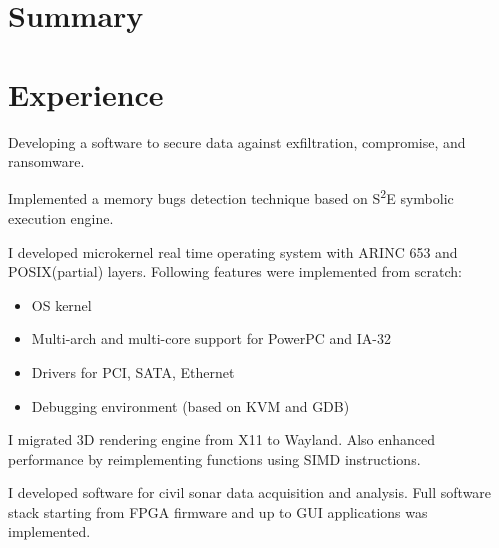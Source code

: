 \documentclass[11pt, a4paper]{moderncv}
\begin{document}
\makecvtitle



\section{Summary}





\section{Experience}

{
  Developing a software to secure data against exfiltration, compromise, and ransomware.
}

{
  Implemented a memory bugs detection technique based on S\textsuperscript{2}E symbolic execution engine.
}

{
  I developed microkernel real time operating system with ARINC 653 and POSIX(partial) layers.
  Following features were implemented from scratch:
    \begin{itemize}
    \item OS kernel
    \item Multi-arch and multi-core support for PowerPC and IA-32
    \item Drivers for PCI, SATA, Ethernet
    \item Debugging environment (based on KVM and GDB)
    \end{itemize}
}

{
  I migrated 3D rendering engine from X11 to Wayland.
  Also enhanced performance by reimplementing functions using SIMD instructions.
}

{
  I developed software for civil sonar data acquisition and analysis.
  Full software stack starting from FPGA firmware and up to GUI applications was implemented.
}
\end{document}
